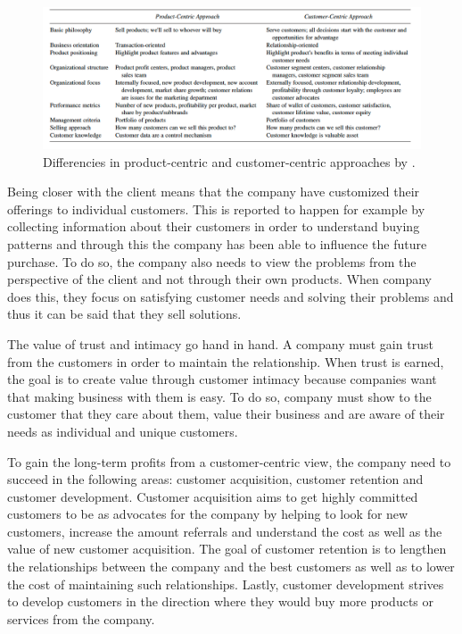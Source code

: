 \begin{figure}[ht]
  \begin{center}
    \includegraphics[scale=2, width=\textwidth]{dippa/images/ProductVsCustomer.png}
    \caption{Differencies in product-centric and customer-centric approaches by \textcite{PathToCustomerCentricity:2006}.}
    \label{fig:productvscustomer}
  \end{center}
\end{figure}

Being closer with the client means that the company have customized their offerings to individual customers. This is reported to happen for example by collecting information about their customers in order to understand buying patterns and through this the company has been able to influence the future purchase. To do so, the company also needs to view the problems from the perspective of the client and not through their own products. When company does this, they focus on satisfying customer needs and solving their problems and thus it can be said that they sell solutions. \parencite{Parniangtong:2017}

The value of trust and intimacy go hand in hand. A company must gain trust from the customers in order to maintain the relationship. When trust is earned, the goal is to create value through customer intimacy because companies want that making business with them is easy. To do so, company must show to the customer that they care about them, value their business and are aware of their needs as individual and unique customers. \parencite{Parniangtong:2017}

To gain the long-term profits from a customer-centric view, the company need to succeed in the following areas: customer acquisition, customer retention and customer development. Customer acquisition aims to get highly committed customers to be as advocates for the company by helping to look for new customers, increase the amount referrals and understand the cost as well as the value of new customer acquisition. The goal of customer retention is to lengthen the relationships between the company and the best customers as well as to lower the cost of maintaining such relationships. Lastly, customer development strives to develop customers in the direction where they would buy more products or services from the company. \parencite{Fader:2012}

